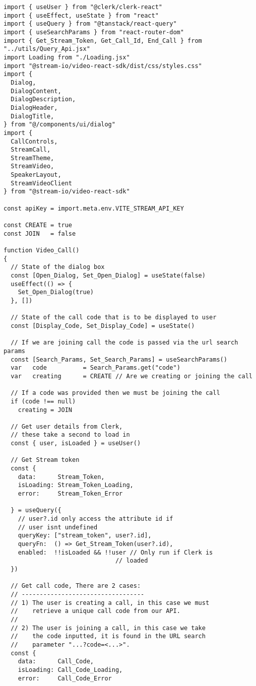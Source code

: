 \begin{verbatim}
import { useUser } from "@clerk/clerk-react"
import { useEffect, useState } from "react"
import { useQuery } from "@tanstack/react-query"
import { useSearchParams } from "react-router-dom"
import { Get_Stream_Token, Get_Call_Id, End_Call } from "../utils/Query_Api.jsx"
import Loading from "./Loading.jsx"
import "@stream-io/video-react-sdk/dist/css/styles.css"
import {
  Dialog,
  DialogContent,
  DialogDescription,
  DialogHeader,
  DialogTitle,
} from "@/components/ui/dialog"
import {
  CallControls,
  StreamCall,
  StreamTheme,
  StreamVideo,
  SpeakerLayout,
  StreamVideoClient
} from "@stream-io/video-react-sdk"

const apiKey = import.meta.env.VITE_STREAM_API_KEY

const CREATE = true
const JOIN   = false

function Video_Call()
{
  // State of the dialog box
  const [Open_Dialog, Set_Open_Dialog] = useState(false)
  useEffect(() => {
    Set_Open_Dialog(true)
  }, [])

  // State of the call code that is to be displayed to user
  const [Display_Code, Set_Display_Code] = useState()

  // If we are joining call the code is passed via the url search params
  const [Search_Params, Set_Search_Params] = useSearchParams()
  var   code          = Search_Params.get("code")
  var   creating      = CREATE // Are we creating or joining the call

  // If a code was provided then we must be joining the call
  if (code !== null)
    creating = JOIN

  // Get user details from Clerk,
  // these take a second to load in
  const { user, isLoaded } = useUser()

  // Get Stream token
  const {
    data:      Stream_Token,
    isLoading: Stream_Token_Loading,
    error:     Stream_Token_Error

  } = useQuery({
    // user?.id only access the attribute id if
    // user isnt undefined
    queryKey: ["stream_token", user?.id],
    queryFn:  () => Get_Stream_Token(user?.id),
    enabled:  !!isLoaded && !!user // Only run if Clerk is
	                           // loaded
  })

  // Get call code, There are 2 cases:
  // ----------------------------------
  // 1) The user is creating a call, in this case we must
  //    retrieve a unique call code from our API.
  //
  // 2) The user is joining a call, in this case we take
  //    the code inputted, it is found in the URL search
  //    parameter "...?code=<...>".
  const {
    data:      Call_Code,
    isLoading: Call_Code_Loading,
    error:     Call_Code_Error


\end{verbatim}
